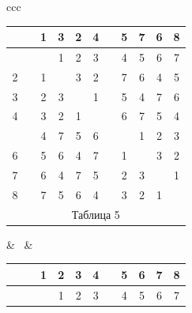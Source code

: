 \begin{center}





\begin{tabular}{ccc}





\begin{tabular}{ccccccccccc}


\ & \vline & 1 & 3 & 2 & 4 & \vline & 5 & 7 & 6 & 8 \\


\hline


 1 & \vline & \ & 1 & 2 & 3 & \vline & 4 & 5 & 6 & 7 \\


2 & \vline & 1 & \ & 3 & 2 & \vline & 7 & 6 & 4 & 5 \\


3 & \vline & 2 & 3 & \ & 1 & \vline & 5 & 4 & 7 & 6 \\


4 & \vline & 3 & 2 & 1 & \ & \vline & 6 & 7 & 5 & 4 \\


\hline


 5 & \vline & 4 & 7 & 5 & 6 & \vline & \ & 1 & 2 & 3 \\


6 & \vline & 5 & 6 & 4 & 7 & \vline & 1 & \ & 3 & 2 \\


7 & \vline & 6 & 4 & 7 & 5 & \vline & 2 & 3 & \ & 1 \\


8 & \vline & 7 & 5 & 6 & 4 & \vline & 3 & 2 & 1 & \ \\


\multicolumn{11}{c}{ Таблица 5}


\end{tabular}





& \ & 





\begin{tabular}{ccccccccccc}


\ & \vline & 1 & 2 & 3 & 4 & \vline & 5 & 6 & 7 & 8 \\


\hline


 1 & \vline & \ & 1 & 2 & 3 & \vline & 4 & 5 & 6 & 7 \\



\end{tabular}
\end{tabular}
\end{center}

